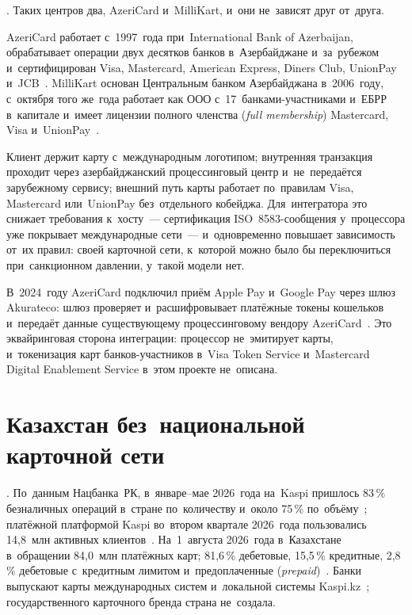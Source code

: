 . Таких
центров два, AzeriCard и~MilliKart, и~они не~зависят друг от~друга.

AzeriCard работает с~1997~года при~International Bank of Azerbaijan,
обрабатывает операции двух десятков банков в~Азербайджане и~за~рубежом
и~сертифицирован Visa, Mastercard, American Express, Diners Club, UnionPay
и~JCB~\cite{banks-az-azericard}. MilliKart основан Центральным банком
Азербайджана в~2006~году, с~октября того же~года работает как ООО
с~17~банками-участниками и~ЕБРР в~капитале и~имеет лицензии полного членства
(\textit{full membership}) Mastercard, Visa
и~UnionPay~\cite{millikart-overview}.

Клиент держит карту с~международным логотипом; внутренняя транзакция проходит
через азербайджанский процессинговый центр и~не~передаётся зарубежному сервису;
внешний путь карты работает по~правилам Visa, Mastercard или~UnionPay
без~отдельного кобейджа. Для~интегратора это снижает требования к~хосту~---
сертификация ISO~8583-сообщения у~процессора уже покрывает международные
сети~--- и~одновременно повышает зависимость от~их правил: своей карточной
сети, к~которой можно было бы переключиться при~санкционном давлении,
у~такой модели нет.

В~2024~году AzeriCard подключил приём Apple Pay и~Google Pay через шлюз
Akurateco: шлюз проверяет и~расшифровывает платёжные токены кошельков
и~передаёт данные существующему процессинговому вендору
AzeriCard~\cite{akurateco-azericard-2024}. Это эквайринговая сторона
интеграции: процессор не~эмитирует карты, и~токенизация карт
банков-участников в~Visa Token Service и~Mastercard Digital Enablement Service
в~этом проекте не~описана.

\section{Казахстан без~национальной карточной сети}\label{sec:regional-kazakhstan}

. По~данным Нацбанка~РК, в~январе--мае 2026~года
на~Kaspi пришлось 83\,\% безналичных операций в~стране по~количеству
и~около 75\,\% по~объёму~\cite{oninvest-kz-unified-qr-2026}; платёжной
платформой Kaspi во~втором квартале 2026~года пользовались 14,8~млн активных
клиентов~\cite{kaspi-payments-platform}. На~1~августа 2026~года в~Казахстане
в~обращении 84,0~млн платёжных карт; 81,6\,\% дебетовые, 15,5\,\% кредитные,
2,8\,\% дебетовые с~кредитным лимитом и~предоплаченные
(\textit{prepaid})~\cite{nbk-cards-statistics}. Банки выпускают карты
международных систем и~локальной системы Kaspi.kz~\cite{nbk-cards-statistics};
государственного карточного бренда страна не~создала.


